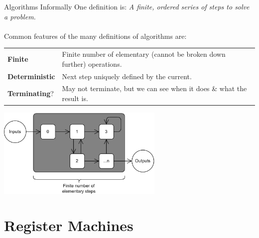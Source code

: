 \begin{definitionbox}{Algorithms Informally}
	One definition is: \textit{A finite, ordered series of steps to solve a problem.}
	\\
	\\ Common features of the many definitions of algorithms are:
	\begin{center}
		\begin{tabular}{l p{}}
			\textbf{Finite}        & Finite number of elementary (cannot be broken down further) operations. \\
			\textbf{Deterministic} & Next step uniquely defined by the current.                              \\
			\textbf{Terminating}?  & May not terminate, but we can see when it does \& what the result is.   \\
		\end{tabular}
	\end{center}
	\begin{center}
		\includegraphics[width=0.6\textwidth]{register_machines/images/algorithm.drawio.png}
	\end{center}
\end{definitionbox}

\section{Register Machines}

